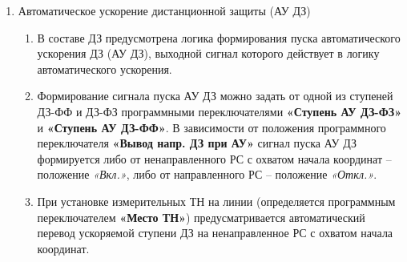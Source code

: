 \begin{enumerate}[label=\arabic{section}.\arabic{subsection}.\arabic{enumi}, labelsep=4pt, leftmargin=0pt, itemindent=57pt, itemsep=0pt, parsep=5pt]
\begin{enumerate}[label=\arabic{section}.\arabic{subsection}.\arabic{enumi}.\arabic*, labelsep=4pt, leftmargin=0em, itemindent=65pt, parsep=0pt]
\item
Блокировка при качаниях, реагирующая на приращение во времени векторов тока прямой и обратной последовательностей, имеет два измерительных органа: чувствительный и грубый.

\item
Контроль ступеней ДЗ от блокировки при качаниях вводится программными переключателями \textbf{«БК ДЗ-ФФ(ФЗ)-N»}, имеющими четыре положения:
\begin{enumerate}[label=\arabic*)]
\item \textit{Откл.} -- ступень работает без контроля от БК;
\item \textit{БК-I-б} -- ступень пускается от сигнала ввода быстродействующих ступеней;
\item \textit{БК-I-м} -- ступень пускается от сигнала ввода медленнодействующих ступеней;
\item \textit{БК-Z} -- ступень пускается от сигнала БК по скорости изменения величины сопротивления.
\end{enumerate}
\end{enumerate}


\item\label{sec:secau} Автоматическое ускорение дистанционной защиты (АУ ДЗ)
\begin{enumerate}[label=\arabic{section}.\arabic{subsection}.\arabic{enumi}.\arabic*, labelsep=4pt, leftmargin=0em, itemindent=65pt, parsep=0pt]

\item
В составе ДЗ предусмотрена логика формирования пуска автоматического ускорения ДЗ (АУ ДЗ), выходной сигнал которого действует в логику автоматического ускорения. 
\item
Формирование сигнала пуска АУ ДЗ можно задать от одной из ступеней ДЗ-ФФ и ДЗ-ФЗ программными переключателями \textbf{«Ступень АУ ДЗ-ФЗ»} и \textbf{«Ступень АУ ДЗ-ФФ»}. В зависимости от положения программного переключателя \textbf{«Вывод напр. ДЗ при АУ»} сигнал пуска АУ ДЗ формируется либо от ненаправленного РС с охватом начала координат – положение \textit{«Вкл.»}, либо от направленного РС – положение \textit{«Откл.»}.

\item
При установке измерительных ТН на линии (определяется программным переключателем \textbf{«Место ТН»}) предусматривается автоматический перевод ускоряемой ступени ДЗ на ненаправленное РС с охватом начала координат.


\end{enumerate}
\end{enumerate}

